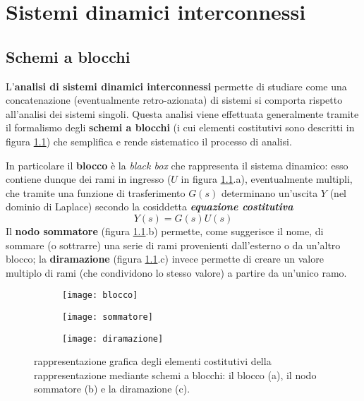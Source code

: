 \chapter{Sistemi dinamici interconnessi}
	
\section{Schemi a blocchi}
	
	\begin{concetto}
		L'\textbf{analisi di sistemi dinamici interconnessi} permette di studiare come una concatenazione (eventualmente retro-azionata) di sistemi si comporta rispetto all'analisi dei sistemi singoli. Questa analisi viene effettuata generalmente tramite il formalismo degli \textbf{schemi a blocchi} (i cui elementi costitutivi sono descritti in figura \ref{fig:int:elementicostitutivi}) che semplifica e rende sistematico il processo di analisi.
	\end{concetto}
	
	In particolare il \textbf{blocco} è la \textit{black box} che rappresenta il sistema dinamico: esso contiene dunque dei rami in ingresso ($U$ in figura \ref{fig:int:elementicostitutivi}.a), eventualmente multipli, che tramite una funzione di trasferimento $G(s)$ determinano un'uscita $Y$ (nel dominio di Laplace) secondo la cosiddetta \textbf{\textit{equazione costitutiva}}
	\[  Y(s) = G(s) U(s) \]
	Il \textbf{nodo sommatore} (figura \ref{fig:int:elementicostitutivi}.b) permette, come suggerisce il nome, di sommare (o sottrarre) una serie di rami provenienti dall'esterno o da un'altro blocco; la \textbf{diramazione} (figura \ref{fig:int:elementicostitutivi}.c) invece permette di creare un valore multiplo di rami (che condividono lo stesso valore) a partire da un'unico ramo.
	
	\begin{figure}[bht]
		\centering
		\begin{subfigure}{0.325\linewidth}
			\centering \texttt{[image: blocco]} \caption{}
		\end{subfigure}
		\begin{subfigure}{0.325\linewidth}
			\centering \texttt{[image: sommatore]} \caption{}
		\end{subfigure}
		\begin{subfigure}{0.325\linewidth}
			\centering \texttt{[image: diramazione]} \caption{}
		\end{subfigure}
		\caption{rappresentazione grafica degli elementi costitutivi della rappresentazione mediante schemi a blocchi: il blocco (a), il nodo sommatore (b) e la diramazione (c).}
		\label{fig:int:elementicostitutivi}
	\end{figure}
	
